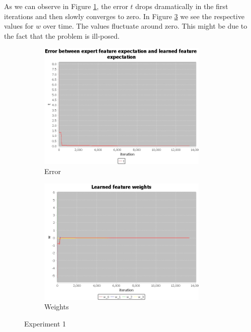 \documentclass[10pt,a4paper,twocolumn]{article}
\begin{document}
As we can observe in Figure \ref{fig:experiment1t}, the error $t$ drops dramatically in the first iterations and then slowly converges to zero. In Figure \ref{fig:experiment1w} we see the respective values for $w$ over time. The values fluctuate around zero. This might be due to the fact that the problem is ill-posed.

\begin{figure}[h]
\begin{subfigure}[b]{0.5\textwidth}
	\includegraphics[width=\textwidth]{experiment_1_t}
	\caption{Error}
	\label{fig:experiment1t}
\end{subfigure}
\begin{subfigure}[b]{0.5\textwidth}
	\includegraphics[width=\textwidth]{experiment_1_w}
	\caption{Weights}
	\label{fig:experiment1w}
\end{subfigure}
\caption{Experiment 1}
\end{figure}
\end{document}
